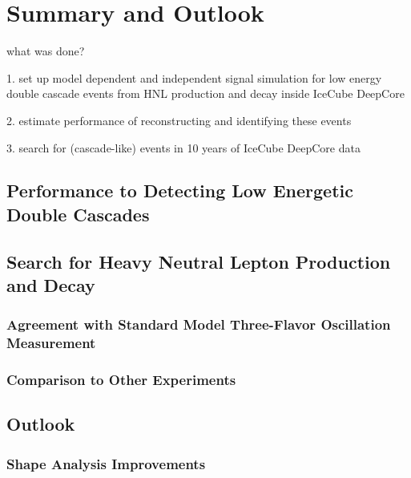 \setchapterpreamble[u]{\margintoc}

\chapter{Summary and Outlook}

what was done?

1. set up model dependent and independent signal simulation for low energy double cascade events from HNL production and decay inside IceCube DeepCore

2. estimate performance of reconstructing and identifying these events

3. search for (cascade-like) events in 10 years of IceCube DeepCore data


\section{Performance to Detecting Low Energetic Double Cascades}


\section{Search for Heavy Neutral Lepton Production and Decay}

\subsection{Agreement with Standard Model Three-Flavor Oscillation Measurement}


\subsection{Comparison to Other Experiments}


\section{Outlook}

\subsection{Shape Analysis Improvements}

